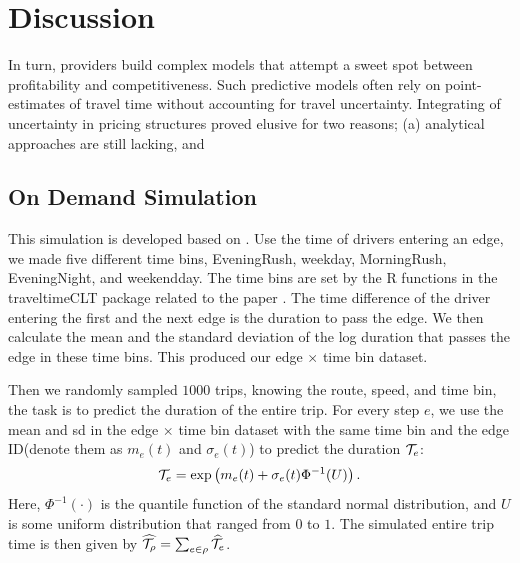 \documentclass[12pt]{article}
\begin{document}
{{{{{{\section{Discussion} \label{sec:discussion}
In turn, providers build complex models that attempt a sweet spot between profitability and competitiveness. Such predictive models often rely on point-estimates of travel time without accounting for travel uncertainty. Integrating of uncertainty in pricing structures proved elusive for two reasons; (a) analytical approaches are still lacking, and




\begin{appendices}
    


\section{On Demand Simulation}\label{sec:on demand simulation}
This simulation is developed based on \citet{melmasri_traveltimeCLT_sample_ride}. Use the time of drivers entering an edge, we made five different time bins, EveningRush, weekday, MorningRush, EveningNight, and weekendday.  The time bins are set by the R functions in the traveltimeCLT package related to the paper \cite{elmasri2020predictive}. The time difference of the driver entering the first and the next edge is the duration to pass the edge. We then calculate the mean and the standard deviation of the log duration that passes the edge in these time bins. This produced our edge $\times$ time bin dataset. 

Then we randomly sampled $1000$ trips, knowing the route, speed, and time bin, the task is to predict the duration of the entire trip. For every step $e$, we use the mean and sd in the edge $\times$ time bin dataset with the same time bin and the edge ID(denote them as $m_e(t)$ and $\sigma_e(t)$) to predict the duration $\mathcal{T}_e$:
    $${\mathcal{T}_e}=\exp\left(m_e(t)+\sigma_e(t)\Phi^{-1}(U)\right). $$
Here, $\Phi^{-1}(\cdot)$ is the quantile function of the standard normal distribution, and $U$ is some uniform distribution that ranged from $0$ to $1.$ The simulated entire trip time is then given by $\widehat{\mathcal{T}_\rho}=\sum_{e\in\rho}\widehat{\mathcal{T}_e}$.


\end{appendices}}}}}}}
\end{document}
